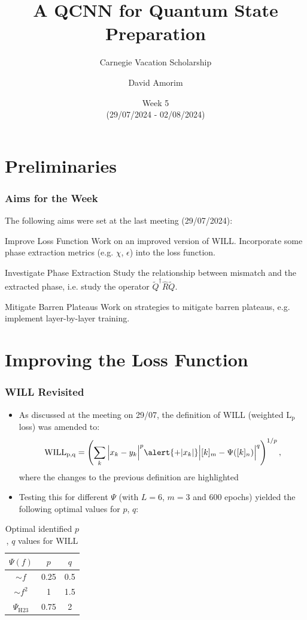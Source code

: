 \documentclass{beamer}
\title[QCNN State Preparation]{A QCNN for Quantum State Preparation}
\subtitle{Carnegie Vacation Scholarship}
\author[David Amorim]{David Amorim}
\institute[]{}
\date[05/08/2024]{Week 5 \\(29/07/2024 - 02/08/2024)}
\begin{document}
\frame{\titlepage}

\section{Preliminaries}
\begin{frame}
\frametitle{Aims for the Week}
The following aims were set at the last meeting (29/07/2024):

\begin{alertblock}{Improve Loss Function}
Work on an improved version of WILL. Incorporate some phase extraction metrics (e.g. $\chi$, $\epsilon$) into the loss function. 
\end{alertblock}

\begin{alertblock}{Investigate Phase Extraction}
Study the relationship between mismatch and the extracted phase, i.e. study the operator $\tilde{Q}^\dagger\hat{R}\tilde{Q}$. 
\end{alertblock}

\begin{alertblock}{Mitigate Barren Plateaus}
Work on strategies to mitigate barren plateaus, e.g. implement layer-by-layer training.
\end{alertblock}
\end{frame}

\section{Improving the Loss Function}

\begin{frame}
\frametitle{WILL Revisited}
\begin{itemize}
\item As discussed at the meeting on 29/07, the definition of \alert{WILL} (weighted L$_\text{p}$ loss) was amended to: 
\begin{equation}
\text{WILL}_\text{p,q} =  \left( \sum_k \Big|x_k -y_k \Big|^p \alert{+ |x_k|} \Big|[k]_m - \Psi([k]_n) \Big|^q \right)^{1/p},
\end{equation}
where the changes to the previous definition are highlighted
\item Testing this for different $\Psi$ (with $L=6$, $m=3$ and 600 epochs) yielded the following optimal values for $p$, $q$:
\end{itemize}
\begin{table}
\centering 
\begin{tabular}{c|c| c}
$\Psi(f)$ & $p$ & $q$ \\ \hline 
$\sim f$ & 0.25 & 0.5  \\
$\sim  f^2$ & 1 & 1.5  \\
$\Psi_{\text{H23}}$ & 0.75 & 2  \\
\end{tabular}
\caption{Optimal identified $p$, $q$ values for WILL}
\end{table}
\end{frame}
\end{document}
